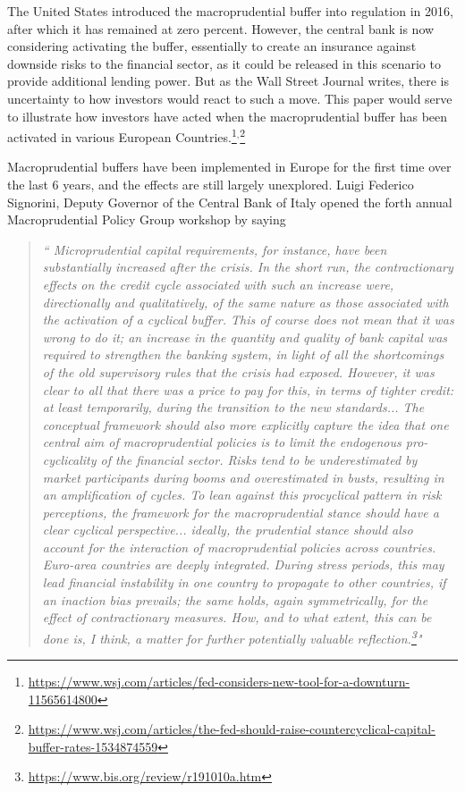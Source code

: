 \documentclass[11pt]{article}
\begin{document}
The United States introduced the macroprudential buffer into regulation in 2016, after which it has remained at zero percent. However, the central bank is now considering activating the buffer, essentially to create an insurance against downside risks to the financial sector, as it could be released in this scenario to provide additional lending power. But as the Wall Street Journal writes, there is uncertainty to how investors would react to such a move. This paper would serve to illustrate how investors have acted when the macroprudential buffer has been activated in various European Countries.\footnote{
\url{https://www.wsj.com/articles/fed-considers-new-tool-for-a-downturn-11565614800}}$^,$\footnote{
\url{https://www.wsj.com/articles/the-fed-should-raise-countercyclical-capital-buffer-rates-1534874559}}

Macroprudential buffers have been implemented in Europe for the first time over the last 6 years, and the effects are still largely unexplored. Luigi Federico Signorini, Deputy Governor of the Central Bank of Italy opened the forth annual Macroprudential Policy Group workshop by saying

\begin{quote}\textit{``
Microprudential capital requirements, for instance, have been substantially increased after the crisis. In the short run, the contractionary effects on the credit cycle associated with such an increase were, directionally and qualitatively, of the same nature as those associated with the activation of a cyclical buffer. This of course does not mean that it was wrong to do it; an increase in the quantity and quality of bank capital was required to strengthen the banking system, in light of all the shortcomings of the old supervisory rules that the crisis had exposed. However, it was clear to all that there was a price to pay for this, in terms of tighter credit: at least temporarily, during the transition to the new standards... The conceptual framework should also more explicitly capture the idea that one central aim of macroprudential policies is to limit the endogenous pro-cyclicality of the financial sector. Risks tend to be underestimated by market participants during booms and overestimated in busts, resulting in an amplification of cycles. To lean against this procyclical pattern in risk perceptions, the framework for the macroprudential stance should have a clear cyclical perspective... ideally, the prudential stance should also account for the interaction of macroprudential policies across countries. Euro-area countries are deeply integrated. During stress periods, this may lead financial instability in one country to propagate to other countries, if an inaction bias prevails; the same holds, again symmetrically, for the effect of contractionary measures. How, and to what extent, this can be done is, I think, a matter for further potentially valuable reflection.\footnote{\url{https://www.bis.org/review/r191010a.htm}}"}
\end{quote}
\end{document}
